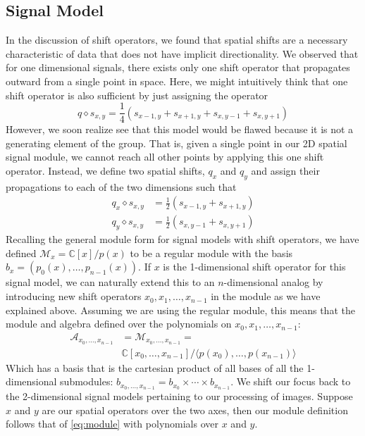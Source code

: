 \documentclass[12pt,technote]{IEEEtran}
\begin{document}
\subsection{Signal Model}
In the discussion of shift operators, we found that spatial shifts are a necessary characteristic of data that does not have implicit directionality. We observed that for one dimensional signals, there exists only one shift operator that propagates outward from a single point in space. Here, we might intuitively think that one shift operator is also sufficient by just assigning the operator
\begin{equation*}
    q \diamond s_{x,y} = \frac{1}{4}(s_{x-1,y} + s_{x+1,y} + s_{x,y-1} + s_{x,y+1})
\end{equation*}
However, we soon realize see that this model would be flawed because it is not a generating element of the group. That is, given a single point in our 2D spatial signal module, we cannot reach all other points by applying this one shift operator. Instead, we define two spatial shifts, $q_x$ and $q_y$ and assign their propagations to each of the two dimensions such that
\begin{align*}
    q_x \diamond s_{x,y} &= \frac{1}{2}(s_{x-1,y} + s_{x+1,y})\\
    q_y \diamond s_{x,y} &= \frac{1}{2}(s_{x,y-1} + s_{x,y+1})
\end{align*}
Recalling the general module form for signal models with shift operators, we have defined $\mathcal{M}_x = \mathbb{C}[x]/p(x)$ to be a regular module with the basis $b_x = (p_0(x), \dots, p_{n-1}(x))$. If $x$ is the 1-dimensional shift operator for this signal model, we can naturally extend this to an $n$-dimensional analog by introducing new shift operators $x_0, x_1, \dots, x_{n-1}$ in the module as we have explained above. Assuming we are using the regular module, this means that the module and algebra defined over the polynomials on $x_0, x_1, \dots, x_{n-1}$:
\begin{align}
    \mathcal{A}_{x_0,\dots, x_{n-1}} &= \mathcal{M}_{x_0, \dots, x_{n-1}} = \nonumber\\
    &\mathbb{C}[x_0, \dots, x_{n-1}]/\langle p(x_0), \dots, p(x_{n-1})\rangle\label{eq:module}
\end{align}
Which has a basis that is the cartesian product of all bases of all the 1-dimensional submodules: $b_{x_0, \dots, x_{n-1}} = b_{x_0}\times \cdots \times b_{x_{n-1}}$. We shift our focus back to the 2-dimensional signal models pertaining to our processing of images. Suppose $x$ and $y$ are our spatial operators over the two axes, then our module definition follows that of \eqref{eq:module} with polynomials over $x$ and $y$.
\end{document}
